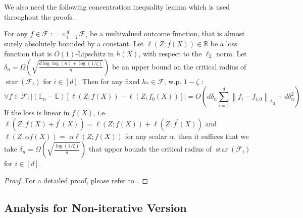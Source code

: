 \documentclass[12pt]{extarticle} %
\begin{document}

We also need the following concentration inequality lemma which is used throughout the proofs. 
\begin{lemma}\label{lem:local-concen}
For any $f \in \mathcal{F}:=\times_{i=1}^d \mathcal{F}_i$ be a multivalued outcome function, that is almost surely absolutely bounded by a constant. Let $\ell(Z ; f(X)) \in \mathbb{R}$ be a loss function that is $O(1)$-Lipschitz in $h(X)$, with respect to the $\ell_2$ norm. Let $\delta_n=\Omega\left(\sqrt{\frac{d \log \log (n)+\log (1 / \zeta)}{n}}\right)$ be an upper bound on the critical radius of $\operatorname{star}\left(\mathcal{F}_i\right)$ for $i \in[d]$. Then for any fixed $h_* \in \mathcal{F}$, w.p. $1-\zeta$ :
$$
\forall f \in \mathcal{F}:\left|\left(\mathbb{E}_n-\mathbb{E}\right)\left[\ell(Z ; f(X))-\ell\left(Z ; f_0(X)\right)\right]\right|=O\left(d \delta_n \sum_{i=1}^d\left\|f_i-f_{i, 0}\right\|_{L_2}+d \delta_n^2\right)
$$
If the loss is linear in $f(X)$, i.e. $\ell\left(Z ; f(X)+f^{\prime}(X)\right)=\ell(Z ; f(X))+\ell\left(Z ; f^{\prime}(X)\right)$ and $\ell(Z ; \alpha f(X))=$ $\alpha \ell(Z ; f(X))$ for any scalar $\alpha$, then it suffices that we take $\delta_n=\Omega\left(\sqrt{\frac{\log (1 / \zeta)}{n}}\right)$ that upper bounds the critical radius of $\operatorname{star}\left(\mathcal{F}_i\right)$ for $i \in[d]$.
\end{lemma}
\begin{proof}
    For a detailed proof, please refer to \cite{foster2019orthogonal}.
\end{proof}
\subsection{Analysis for Non-iterative Version}
\end{document}
